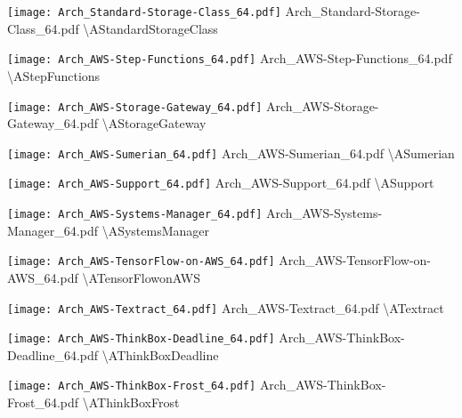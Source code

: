  {\texttt{[image: Arch\_Standard-Storage-Class\_64.pdf]}} {Arch\_Standard-Storage-Class\_64.pdf} {{\textbackslash}AStandardStorageClass}

 {\texttt{[image: Arch\_AWS-Step-Functions\_64.pdf]}} {Arch\_AWS-Step-Functions\_64.pdf} {{\textbackslash}AStepFunctions}

 {\texttt{[image: Arch\_AWS-Storage-Gateway\_64.pdf]}} {Arch\_AWS-Storage-Gateway\_64.pdf} {{\textbackslash}AStorageGateway}

 {\texttt{[image: Arch\_AWS-Sumerian\_64.pdf]}} {Arch\_AWS-Sumerian\_64.pdf} {{\textbackslash}ASumerian}

 {\texttt{[image: Arch\_AWS-Support\_64.pdf]}} {Arch\_AWS-Support\_64.pdf} {{\textbackslash}ASupport}

 {\texttt{[image: Arch\_AWS-Systems-Manager\_64.pdf]}} {Arch\_AWS-Systems-Manager\_64.pdf} {{\textbackslash}ASystemsManager}

 {\texttt{[image: Arch\_AWS-TensorFlow-on-AWS\_64.pdf]}} {Arch\_AWS-TensorFlow-on-AWS\_64.pdf} {{\textbackslash}ATensorFlowonAWS}

 {\texttt{[image: Arch\_AWS-Textract\_64.pdf]}} {Arch\_AWS-Textract\_64.pdf} {{\textbackslash}ATextract}

 {\texttt{[image: Arch\_AWS-ThinkBox-Deadline\_64.pdf]}} {Arch\_AWS-ThinkBox-Deadline\_64.pdf} {{\textbackslash}AThinkBoxDeadline}

 {\texttt{[image: Arch\_AWS-ThinkBox-Frost\_64.pdf]}} {Arch\_AWS-ThinkBox-Frost\_64.pdf} {{\textbackslash}AThinkBoxFrost}

